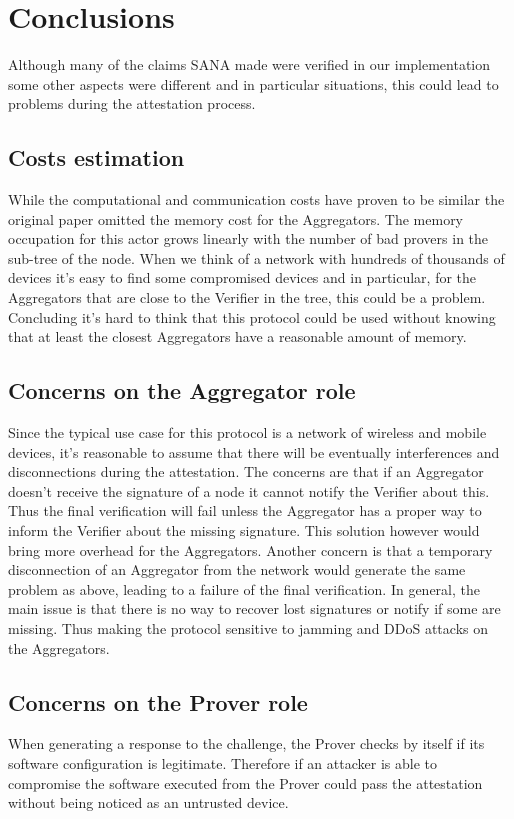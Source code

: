 \section{Conclusions}

Although many of the claims SANA made were verified in our implementation some other aspects were different and in particular situations, this could lead to problems during the attestation process.
\subsection{Costs estimation}
While the computational and communication costs have proven to be similar the original paper omitted the memory cost for the Aggregators. 
The memory occupation for this actor grows linearly with the number of bad provers in the sub-tree of the node. 
When we think of a network with hundreds of thousands of devices it's easy to find some compromised devices and in particular, for the Aggregators that are close to the Verifier in the tree, this could be a problem.
Concluding it's hard to think that this protocol could be used without knowing that at least the closest Aggregators have a reasonable amount of memory.

\subsection{Concerns on the Aggregator role}
Since the typical use case for this protocol is a network of wireless and mobile devices, it's reasonable to assume that there will be eventually interferences and disconnections during the attestation.
The concerns are that if an Aggregator doesn't receive the signature of a node it cannot notify the Verifier about this. Thus the final verification will fail unless the Aggregator has a proper way to inform the Verifier about the missing signature.
This solution however would bring more overhead for the Aggregators.
Another concern is that a temporary disconnection of an Aggregator from the network would generate the same problem as above, leading to a failure of the final verification.
In general, the main issue is that there is no way to recover lost signatures or notify if some are missing. Thus making the protocol sensitive to jamming and DDoS attacks on the Aggregators. 

\subsection{Concerns on the Prover role}
When generating a response to the challenge, the Prover checks by itself if its software configuration is legitimate.
Therefore if an attacker is able to compromise the software executed from the Prover could pass the attestation without being noticed as an untrusted device.